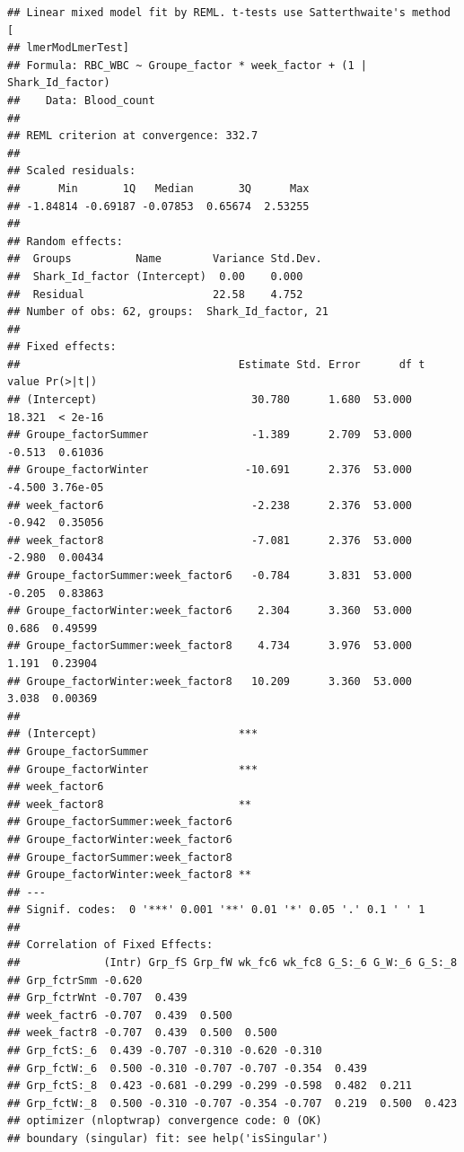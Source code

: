 \documentclass[
]{article}
\begin{document}
\begin{verbatim}
## Linear mixed model fit by REML. t-tests use Satterthwaite's method [
## lmerModLmerTest]
## Formula: RBC_WBC ~ Groupe_factor * week_factor + (1 | Shark_Id_factor)
##    Data: Blood_count
## 
## REML criterion at convergence: 332.7
## 
## Scaled residuals: 
##      Min       1Q   Median       3Q      Max 
## -1.84814 -0.69187 -0.07853  0.65674  2.53255 
## 
## Random effects:
##  Groups          Name        Variance Std.Dev.
##  Shark_Id_factor (Intercept)  0.00    0.000   
##  Residual                    22.58    4.752   
## Number of obs: 62, groups:  Shark_Id_factor, 21
## 
## Fixed effects:
##                                  Estimate Std. Error      df t value Pr(>|t|)
## (Intercept)                        30.780      1.680  53.000  18.321  < 2e-16
## Groupe_factorSummer                -1.389      2.709  53.000  -0.513  0.61036
## Groupe_factorWinter               -10.691      2.376  53.000  -4.500 3.76e-05
## week_factor6                       -2.238      2.376  53.000  -0.942  0.35056
## week_factor8                       -7.081      2.376  53.000  -2.980  0.00434
## Groupe_factorSummer:week_factor6   -0.784      3.831  53.000  -0.205  0.83863
## Groupe_factorWinter:week_factor6    2.304      3.360  53.000   0.686  0.49599
## Groupe_factorSummer:week_factor8    4.734      3.976  53.000   1.191  0.23904
## Groupe_factorWinter:week_factor8   10.209      3.360  53.000   3.038  0.00369
##                                     
## (Intercept)                      ***
## Groupe_factorSummer                 
## Groupe_factorWinter              ***
## week_factor6                        
## week_factor8                     ** 
## Groupe_factorSummer:week_factor6    
## Groupe_factorWinter:week_factor6    
## Groupe_factorSummer:week_factor8    
## Groupe_factorWinter:week_factor8 ** 
## ---
## Signif. codes:  0 '***' 0.001 '**' 0.01 '*' 0.05 '.' 0.1 ' ' 1
## 
## Correlation of Fixed Effects:
##             (Intr) Grp_fS Grp_fW wk_fc6 wk_fc8 G_S:_6 G_W:_6 G_S:_8
## Grp_fctrSmm -0.620                                                 
## Grp_fctrWnt -0.707  0.439                                          
## week_factr6 -0.707  0.439  0.500                                   
## week_factr8 -0.707  0.439  0.500  0.500                            
## Grp_fctS:_6  0.439 -0.707 -0.310 -0.620 -0.310                     
## Grp_fctW:_6  0.500 -0.310 -0.707 -0.707 -0.354  0.439              
## Grp_fctS:_8  0.423 -0.681 -0.299 -0.299 -0.598  0.482  0.211       
## Grp_fctW:_8  0.500 -0.310 -0.707 -0.354 -0.707  0.219  0.500  0.423
## optimizer (nloptwrap) convergence code: 0 (OK)
## boundary (singular) fit: see help('isSingular')
\end{verbatim}
\end{document}
